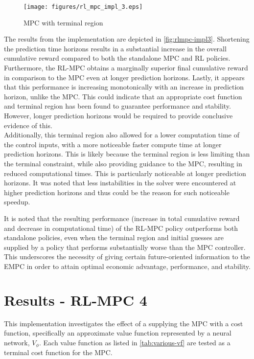 \begin{figure}[H]
	\centering
	\texttt{[image: figures/rl\_mpc\_impl\_3.eps]}
	\caption{MPC with terminal region}
	\label{fig:rlmpc-impl3}
\end{figure}

The results from the implementation are depicted in \autoref{fig:rlmpc-impl3}. Shortening the prediction time horizons results in a substantial increase in the overall cumulative reward compared to both the standalone MPC and RL policies. Furthermore, the RL-MPC obtains a marginally superior final cumulative reward in comparison to the MPC even at longer prediction horizons. Lastly, it appears that this performance is increasing monotonically with an increase in prediction horizon, unlike the MPC. This could indicate that an appropriate cost function and terminal region has been found to  guarantee performance and stability. However, longer prediction horizons would be required to provide conclusive evidence of this.\\

Additionally, this terminal region also allowed for a lower computation time of the control inputs, with a more noticeable faster compute time at longer prediction horizons. This is likely because the terminal region is less limiting than the terminal constraint,  while also providing guidance to the MPC, resulting in reduced computational times. This is particularly noticeable at longer prediction horizons. It was noted that less instabilities in the solver were encountered at higher prediction horizons and thus could be the reason for such noticeable speedup.

It is noted that the resulting performance (increase in total cumulative reward and decrease in computational time) of the RL-MPC policy outperforms both standalone policies, even when the terminal region and initial guesses are supplied by a policy that performs substantially worse than the MPC controller. This underscores the necessity of giving certain future-oriented information to the EMPC in order to attain optimal economic advantage, performance, and stability. 

\section{Results - RL-MPC 4}
This implementation investigates the effect of a supplying the MPC with a cost function, specifically an approximate value function represented by a neural network, $V_{\phi}$. Each value function as listed in \autoref{tab:various-vf} are tested as a terminal cost function for the MPC.


